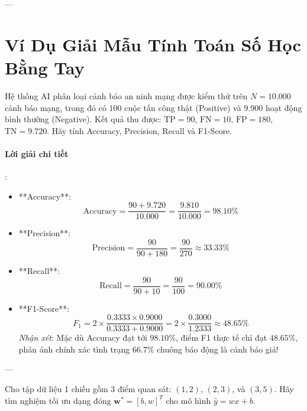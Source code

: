 ---

\section{Ví Dụ Giải Mẫu Tính Toán Số Học Bằng Tay}
\label{sec:ch05-numerical-walkthrough}

\begin{example}
Hệ thống AI phân loại cảnh báo an ninh mạng được kiểm thử trên $N = 10.000$ cảnh báo mạng, trong đó có $100$ cuộc tấn công thật (Positive) và $9.900$ hoạt động bình thường (Negative).
Kết quả thu được: $\text{TP} = 90$, $\text{FN} = 10$, $\text{FP} = 180$, $\text{TN} = 9.720$.
Hãy tính Accuracy, Precision, Recall và F1-Score.
\end{example}

\paragraph{Lời giải chi tiết}:
\begin{itemize}
  \item[1)] **Accuracy**:
  \begin{equation*}
  \text{Accuracy} = \frac{90 + 9.720}{10.000} = \frac{9.810}{10.000} = 98.10\%
  \end{equation*}
  \item[2)] **Precision**:
  \begin{equation*}
  \text{Precision} = \frac{90}{90 + 180} = \frac{90}{270} \approx 33.33\%
  \end{equation*}
  \item[3)] **Recall**:
  \begin{equation*}
  \text{Recall} = \frac{90}{90 + 10} = \frac{90}{100} = 90.00\%
  \end{equation*}
  \item[4)] **F1-Score**:
  \begin{equation*}
  F_1 = 2 \times \frac{0.3333 \times 0.9000}{0.3333 + 0.9000} = 2 \times \frac{0.3000}{1.2333} \approx 48.65\%
  \end{equation*}
  \textit{Nhận xét}: Mặc dù Accuracy đạt tới $98.10\%$, điểm F1 thực tế chỉ đạt $48.65\%$, phản ánh chính xác tình trạng $66.7\%$ chuông báo động là cảnh báo giả!
\end{itemize}

---

\begin{example}
Cho tập dữ liệu 1 chiều gồm 3 điểm quan sát: $(1, 2)$, $(2, 3)$, và $(3, 5)$.
Hãy tìm nghiệm tối ưu dạng đóng $\mathbf{w}^* = [b, w]^T$ cho mô hình $\hat{y} = w x + b$.
\end{example}

